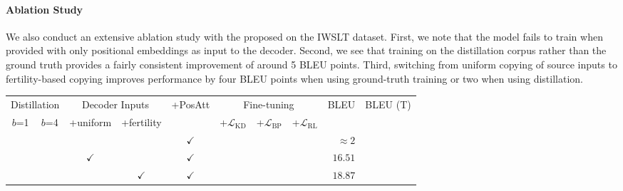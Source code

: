 \paragraph{Ablation Study}
We also conduct an extensive ablation study with the proposed \model{} on the IWSLT dataset. First, we note that the model fails to train when provided with only positional embeddings as input to the decoder. Second, we see that training on the distillation corpus rather than the ground truth provides a fairly consistent improvement of around 5 BLEU points. Third, switching from uniform copying of source inputs to fertility-based copying improves performance by four BLEU points when using ground-truth training or two when using distillation.



\begin{table}[hptb]
\small\centering
\begin{tabular}{cc|ccc|ccc|rr}
\toprule
\multicolumn{2}{c|}{Distillation}  & 
\multicolumn{2}{c}{Decoder Inputs} & 
\multirow{2}[2]{*}{+PosAtt}  & 
\multicolumn{3}{|c|}{Fine-tuning} & 
\multirow{2}[2]{*}{BLEU} & 
\multirow{2}[2]{*}{BLEU (T)}\\
           
$b$=1 &
$b$=4 &
+uniform & 
\multicolumn{1}{c}{+fertility} 
& 
& 
\multicolumn{1}{|c}{+$\mathcal{L}_\text{KD}$}  & 
+$\mathcal{L}_\text{BP}$ & 
+$\mathcal{L}_\text{RL}$ &   &\\

\midrule 
& &              &              & $\checkmark$  & & & & $\approx 2$ \\
& & $\checkmark$ &              & $\checkmark$  & & & & $16.51$\\
& &              & $\checkmark$ & $\checkmark$  & & & & $18.87$\\
\midrule



\end{tabular}
\end{table}
